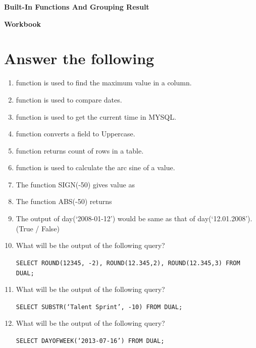 \documentclass[11pt,a4paper]{article}
\begin{document}
\centerline{\huge{ \textbf{Built-In Functions And Grouping Result}}}

\vspace{1pc}

\centerline{\Large{ \textbf{Workbook}}}
\section*{Answer the following}

\begin{enumerate}\itemsep10pt

\item \underline{\hspace{3cm}} function is used to find the maximum value in a column.

\item \underline{\hspace{3cm}} function is used to compare dates.

\item \underline{\hspace{3cm}} function is used to get the current time in MYSQL.

\item \underline{\hspace{3cm}} function converts a field to Uppercase.

\item \underline{\hspace{3cm}} function returns count of rows in a table.

\item \underline{\hspace{3cm}} function is used to calculate the arc sine of a value.

\item The function SIGN(-50) gives value as \underline{\hspace{3cm}}

\item The function ABS(-50) returns \underline{\hspace{3cm}}

\item The output of day(`2008-01-12') would be same as that of day(`12.01.2008'). (True / False)

\item What will be the output of the following query? \underline{\hspace{3cm}}

\texttt{SELECT ROUND(12345, -2), ROUND(12.345,2), ROUND(12.345,3) FROM DUAL;}

\item What will be the output of the following query?\underline{\hspace{3cm}}

\texttt{SELECT SUBSTR(`Talent Sprint', -10) FROM DUAL;}

\item What will be the output of the following query?\underline{\hspace{3cm}}

\texttt{SELECT DAYOFWEEK(`2013-07-16') FROM DUAL;}

\end{enumerate}
\newpage
\end{document}

